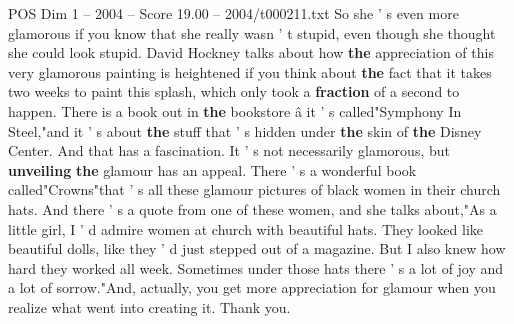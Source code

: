 \begin{textsample}{POS Dim 1 – 2004 – Score 19.00 – 2004/t000211.txt}
So she ' s even more glamorous if you know that she really wasn ' t stupid, even though she thought she could look stupid.
David Hockney talks about how \textbf{the} appreciation of this very glamorous painting is heightened if you think about \textbf{the} fact that it takes two weeks to paint this splash, which only took a \textbf{fraction} of a second to happen.
There is a book out in \textbf{the} bookstore â it ' s called"Symphony In Steel,"and it ' s about \textbf{the} stuff that ' s hidden under \textbf{the} skin of \textbf{the} Disney Center.
And that has a fascination.
It ' s not necessarily glamorous, but \textbf{unveiling} \textbf{the} glamour has an appeal.
There ' s a wonderful book called"Crowns"that ' s all these glamour pictures of black women in their church hats.
And there ' s a quote from one of these women, and she talks about,"As a little girl, I ' d admire women at church with beautiful hats.
They looked like beautiful dolls, like they ' d just stepped out of a magazine.
But I also knew how hard they worked all week.
Sometimes under those hats there ' s a lot of joy and a lot of sorrow."And, actually, you get more appreciation for glamour when you realize what went into creating it.
Thank you.

\end{textsample}
